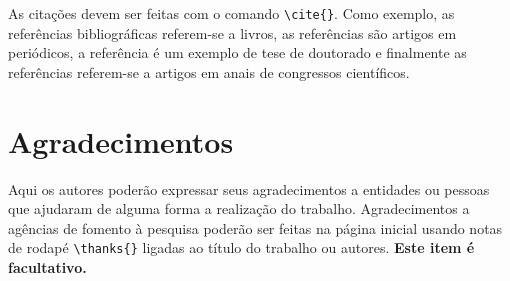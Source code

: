 \documentclass{TEMA}
\begin{document}
As citações devem ser feitas com o comando \verb!\cite{}!.
Como exemplo, as referências bibliográficas \cite{Chihara:1978,
Leveque:1998} referem-se a livros, as referências
\cite{Ausas:2010,Cordeiro:2013,Courant:1943} são artigos em
periódicos, a referência \cite{Linhares:1968} é um exemplo de 
tese de doutorado e finalmente as referências
\cite{Gautschi:1981,Jones:1986,Silva:2014}
referem-se a artigos em anais de congressos científicos.

\section*{Agradecimentos}
Aqui os autores poderão expressar seus agradecimentos a
entidades ou pessoas que ajudaram de alguma forma a realização do
trabalho. Agradecimentos a agências de fomento à pesquisa poderão
ser feitas na página inicial usando notas de rodapé \verb!\thanks{}!
ligadas ao título do trabalho ou autores. {\bf Este item é facultativo.}

\begin{abstract}
{\bf Abstract}. This document, which was prepared using the class
file \texttt{TEMA.cls}, provides some important information for the
authors who intend to submit papers to TEMA.
\end{abstract}



\end{document}
